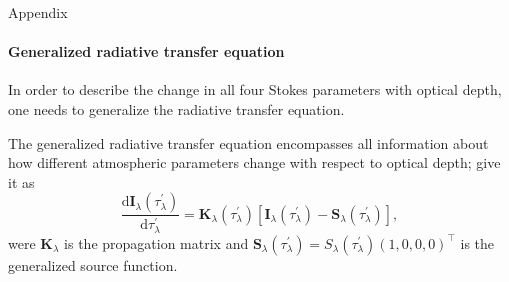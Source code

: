 \documentclass{beamer}
\newcommand\matr[1]{\ensuremath{\boldsymbol{\mathbf{#1}}}}
\newcommand\vect[1]{\ensuremath{\bm{#1}}}
\begin{document}
\begin{frame}[allowframebreaks]{Appendix}
	\framesubtitle{Generalized radiative transfer equation}
	In order to describe the change in all four Stokes parameters with optical depth, one needs to generalize the radiative transfer equation.
	
	The generalized radiative transfer equation encompasses all information about how different atmospheric parameters change with respect to optical depth; \cite[p.150]{delToroIniesta.2003} give it as \begin{equation}
		\frac{\mathrm{d}\vect{I}_\lambda(\tau_\lambda^\prime)}{\mathrm{d}\tau_\lambda^\prime} = \matr{K}_\lambda(\tau_\lambda^\prime)\left[\vect{I}_\lambda(\tau_\lambda^\prime)-\vect{S}_\lambda(\tau_\lambda^\prime)\right],
	\end{equation}
	were $\matr{K}_\lambda$ is the propagation matrix and $\vect{S}_\lambda(\tau_\lambda^\prime) = S_\lambda(\tau_\lambda^\prime)(1,0,0,0)^\top$ is the generalized source function.
\end{frame}
\end{document}
